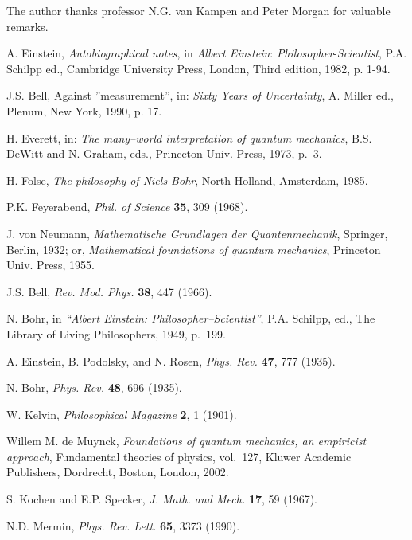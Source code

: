 \documentclass[12pt]{article}
\begin{document}
\medskip
\noindent The author thanks professor N.G. van Kampen and Peter
Morgan for valuable remarks.



%
\raggedright

\begin{thebibliography}{10}

{A. Einstein, {\em Autobiographical notes}, in {\em Albert Einstein}: {\em
  Philosopher}-{\em Scientist}, P.A. Schilpp ed., Cambridge University Press,
  London, Third edition, 1982, p. 1-94.}

{J.S. Bell, Against ''measurement'', in: {\em Sixty Years of Uncertainty}, A.
  Miller ed., Plenum, New York, 1990, p. 17.}

{H. Everett, in: {\em The many--world interpretation of quantum mechanics},
  B.S. DeWitt and N. Graham, eds., Princeton Univ. Press, 1973, p.~3.}

{H. Folse, {\em The philosophy of Niels Bohr}, North Holland, Amsterdam, 1985.}

{P.K. Feyerabend, {\em Phil. of Science} {\bf 35}, 309 (1968).}

{J. von Neumann, {\em Mathematische Grundlagen der Quantenmechanik}, Springer,
  Berlin, 1932; or, {\em Mathematical foundations of quantum mechanics},
  Princeton Univ. Press, 1955.}

{J.S. Bell, {\em Rev. Mod. Phys.} {\bf 38}, 447 (1966).}

{N. Bohr, in {\em ``Albert Einstein: Philosopher--Scientist''}, P.A. Schilpp,
  ed., The Library of Living Philosophers, 1949, p.~199.}

{A. Einstein, B. Podolsky, and N. Rosen, {\em Phys. Rev.} {\bf 47}, 777
  (1935).}

{N. Bohr, {\em Phys. Rev.} {\bf 48}, 696 (1935).}

{W. Kelvin, {\em Philosophical Magazine} {\bf 2}, 1 (1901).}

{Willem M. de Muynck, {\em Foundations of quantum mechanics, an empiricist
  approach}, Fundamental theories of physics, vol.~127, Kluwer Academic
  Publishers, Dordrecht, Boston, London, 2002.}

{S. Kochen and E.P. Specker, {\em J. Math. and Mech.} {\bf 17}, 59 (1967).}

{N.D. Mermin, {\em Phys. Rev. Lett.} {\bf 65}, 3373 (1990).}


\end{thebibliography}
\end{document}
